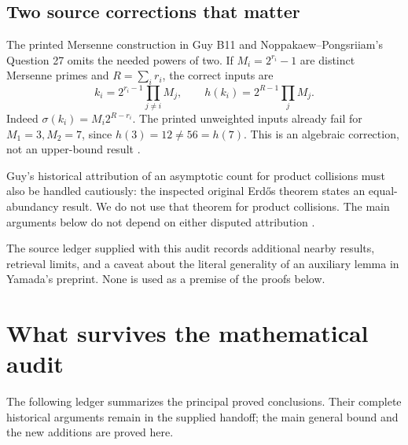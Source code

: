 \documentclass[11pt,a4paper]{article}
\theoremstyle{remark}
\begin{document}
\subsection{Two source corrections that matter}
The printed Mersenne construction in Guy B11 and Noppakaew--Pongsriiam's
Question 27 omits the needed powers of two. If $M_i=2^{r_i}-1$ are distinct
Mersenne primes and $R=\sum_i r_i$, the correct inputs are
\[
 k_i=2^{r_i-1}\prod_{j\ne i}M_j,
 \qquad h(k_i)=2^{R-1}\prod_jM_j.
\]
Indeed $\sigma(k_i)=M_i2^{R-r_i}$. The printed unweighted inputs already
fail for $M_1=3,M_2=7$, since $h(3)=12\ne56=h(7)$. This is an algebraic
correction, not an upper-bound result \cite{guy,np}.

Guy's historical attribution of an asymptotic count for product collisions
must also be handled cautiously: the inspected original Erd\H{o}s theorem
states an equal-abundancy result. We do not use that theorem for product
collisions. The main arguments below do not depend on either disputed
attribution \cite{guy,erdos}.

The source ledger supplied with this audit records additional nearby results,
retrieval limits, and a caveat about the literal generality of an auxiliary
lemma in Yamada's preprint. None is used as a premise of the proofs below.

\section{What survives the mathematical audit}
The following ledger summarizes the principal proved conclusions. Their
complete historical arguments remain in the supplied handoff; the main
general bound and the new additions are proved here.
\end{document}
